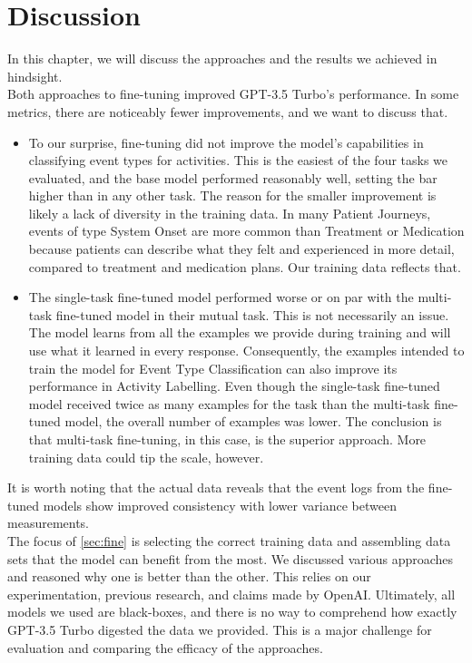 \section{Discussion}\label{sec:discussion}
In this chapter, we will discuss the approaches and the results we achieved in hindsight.\\
Both approaches to fine-tuning improved GPT-3.5 Turbo's performance. In some metrics, there are noticeably fewer improvements, and we want to discuss that.\\
\begin{itemize}[partopsep=0pt, topsep=0pt]
    \item To our surprise, fine-tuning did not improve the model's capabilities in classifying event types for activities. This is the easiest of the four tasks we evaluated, and the base model performed reasonably well, setting the bar higher than in any other task. The reason for the smaller improvement is likely a lack of diversity in the training data. In many Patient Journeys, events of type System Onset are more common than Treatment or Medication because patients can describe what they felt and experienced in more detail, compared to treatment and medication plans. Our training data reflects that.
    \item The single-task fine-tuned model performed worse or on par with the multi-task fine-tuned model in their mutual task. This is not necessarily an issue. The model learns from all the examples we provide during training and will use what it learned in every response. Consequently, the examples intended to train the model for Event Type Classification can also improve its performance in Activity Labelling. Even though the single-task fine-tuned model received twice as many examples for the task  than the multi-task fine-tuned model, the overall number of examples was lower. The conclusion is that multi-task fine-tuning, in this case, is the superior approach. More training data could tip the scale, however.
\end{itemize}
It is worth noting that the actual data reveals that the event logs from the fine-tuned models show improved consistency with lower variance between measurements.\\
The focus of \autoref{sec:fine} is selecting the correct training data and assembling data sets that the model can benefit from the most. We discussed various approaches and reasoned why one is better than the other. This relies on our experimentation, previous research, and claims made by OpenAI. Ultimately, all models we used are black-boxes, and there is no way to comprehend how exactly GPT-3.5 Turbo digested the data we provided. This is a major challenge for evaluation and comparing the efficacy  of the approaches.